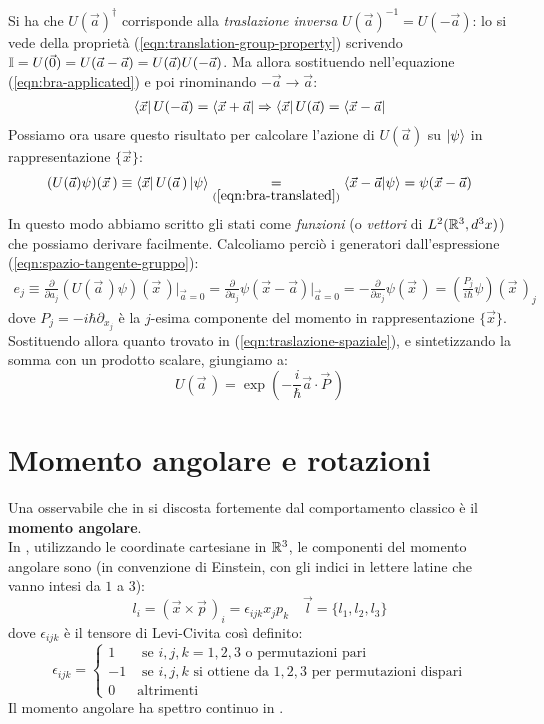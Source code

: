 \documentclass[../../FisicaTeorica.tex]{subfiles}
\begin{document}
Si ha che $U(\vec{a})^\dag$ corrisponde alla \textit{traslazione inversa} $U(\vec{a})^{-1} = U(-\vec{a})$: lo si vede della proprietà (\ref{eqn:translation-group-property}) scrivendo $\mathbb{I} = U(\vec{0})= U(\vec{a}-\vec{a})=U(\vec{a})U(-\vec{a})$. Ma allora sostituendo nell'equazione (\ref{eqn:bra-applicated}) e poi rinominando $-\vec{a}\to \vec{a}$:
\begin{align}
\bra{\vec{x}}U(-\vec{a})=\bra{\vec{x}+\vec{a}} \Rightarrow  \bra{\vec{x}}U(\vec{a})=\bra{\vec{x}-\vec{a}}
 \label{eqn:bra-translated}
\end{align}
Possiamo ora usare questo risultato per calcolare l'azione di $U(\vec{a})$ su $\ket{\psi}$ in rappresentazione $\{\vec{x}\}$:
\begin{align*}
(U(\vec{a}) \psi)(\vec{x}\,) \equiv \bra{\vec{x}}U(\vec{a}\,)\ket{\psi} \underset{(\ref{eqn:bra-translated})}{=} \braket{\vec{x}-\vec{a}|\psi} = \psi(\vec{x}-\vec{a})
\end{align*}
In questo modo abbiamo scritto gli stati come \textit{funzioni} (o \textit{vettori} di $L^2(\mathbb{R}^3,d^3x)$) che possiamo derivare facilmente. Calcoliamo perciò i generatori dall'espressione (\ref{eqn:spazio-tangente-gruppo}):
\begin{align*}
e_j \equiv \frac{\partial}{\partial a_j} (U(\vec{a}\,)\psi)(\vec{x}\,)\Big|_{\vec{a}=0} = \frac{\partial}{\partial a_j} \psi(\vec{x}-\vec{a})\Big|_{\vec{a}=0} = -\frac{\partial}{\partial x_j}\psi(\vec{x}\,)=\left(\frac{P_j}{i\hbar}\psi\right)(\vec{x}\,)_j
\end{align*}
dove $P_j = -i\hbar \partial_{x_j}$ è la $j$-esima componente del momento in rappresentazione $\{\vec{x}\}$.\\
Sostituendo allora quanto trovato in (\ref{eqn:traslazione-spaziale}), e sintetizzando la somma con un prodotto scalare, giungiamo a:
\[
U(\vec{a}\,)=\exp\left({-\frac{i}{\hbar}\vec{a}\cdot \vec{P}\,}\right)
\]

\section{Momento angolare e rotazioni}
Una osservabile che in \MQ si discosta fortemente dal comportamento classico è il \textbf{momento angolare}.\\

In \MC, utilizzando le coordinate cartesiane in $\mathbb{R}^3$, le componenti del momento angolare sono (in convenzione di Einstein, con gli indici in lettere latine che vanno intesi da $1$ a $3$):
\[
l_i = (\vec{x}\times \vec{p}\,)_i= \epsilon_{ijk} x_j p_k \quad \vec{l}=\{l_1, l_2, l_3\}
\]
dove $\epsilon_{ijk}$ è il tensore di Levi-Civita così definito:
\[
\epsilon_{ijk}=\begin{cases}
1 & \text{ se } i,j,k = 1,2,3 \text{ o permutazioni pari}\\
-1 & \text{ se } i,j,k \text{ si ottiene da } 1,2,3 \text{ per permutazioni dispari}\\
0 & \text{altrimenti}
\end{cases}
\]
Il momento angolare ha spettro continuo in \MC.\\
\end{document}
